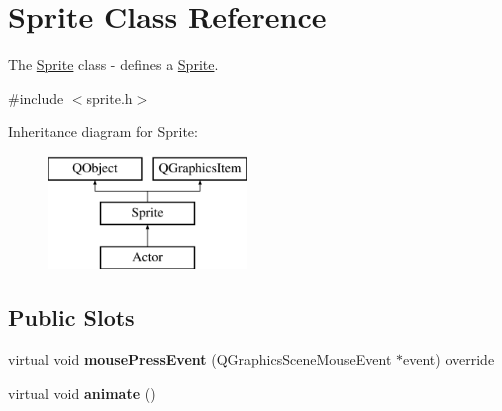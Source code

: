\hypertarget{class_sprite}{}\section{Sprite Class Reference}
\label{class_sprite}


The \hyperlink{class_sprite}{Sprite} class -\/ defines a \hyperlink{class_sprite}{Sprite}.  




{\ttfamily \#include $<$sprite.\+h$>$}

Inheritance diagram for Sprite\+:\begin{figure}[H]
\begin{center}
\leavevmode
\includegraphics[height=3.000000cm]{class_sprite}
\end{center}
\end{figure}
\subsection*{Public Slots}
\begin{DoxyCompactItemize}
\item 
\mbox{\label{class_sprite_ab76c12803dcd1f7a44c4acbbec91380d}} 
virtual void {\bfseries mouse\+Press\+Event} (Q\+Graphics\+Scene\+Mouse\+Event $\ast$event) override
\item 
\mbox{\label{class_sprite_a8935559355be47d8ba7e7eb175aecdb5}} 
virtual void {\bfseries animate} ()
\end{DoxyCompactItemize}
